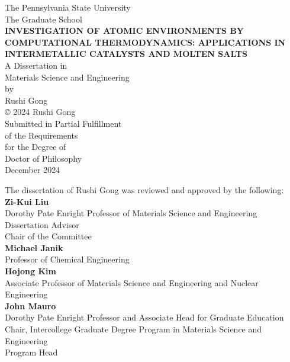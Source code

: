 \documentclass[letterpaper, 12pt]{report}
\begin{document}
\thispagestyle{empty}

{
\centering
The Pennsylvania State University\\
The Graduate School\\
\vfill
{}
{
\fontsize{14}{16}\selectfont
\textbf{INVESTIGATION OF ATOMIC ENVIRONMENTS BY COMPUTATIONAL THERMODYNAMICS: APPLICATIONS IN INTERMETALLIC CATALYSTS AND MOLTEN SALTS}\\
}
\vfill
A Dissertation in\\
Materials Science and Engineering\\
by\\
Rushi Gong\\
\vfill
© 2024 Rushi Gong\\
\vfill
Submitted in Partial Fulfillment\\
of the Requirements\\
for the Degree of\\

\vfill
Doctor of Philosophy\\
\vfill
December 2024\\
\vfill
}

\newpage
{}
\setlength\parindent{0pt} %

The dissertation of Rushi Gong was reviewed and approved by the following:\\

\textbf{Zi-Kui Liu}\\
Dorothy Pate Enright Professor of Materials Science and Engineering\\
Dissertation Advisor\\
Chair of the Committee\\

\textbf{Michael Janik}\\
Professor of Chemical Engineering\\

\textbf{Hojong Kim}\\
Associate Professor of Materials Science and Engineering and Nuclear Engineering\\

\textbf{John Mauro}\\
Dorothy Pate Enright Professor and Associate Head for Graduate Education\\
Chair, Intercollege Graduate Degree Program in Materials Science and Engineering\\
Program Head
\end{document}

